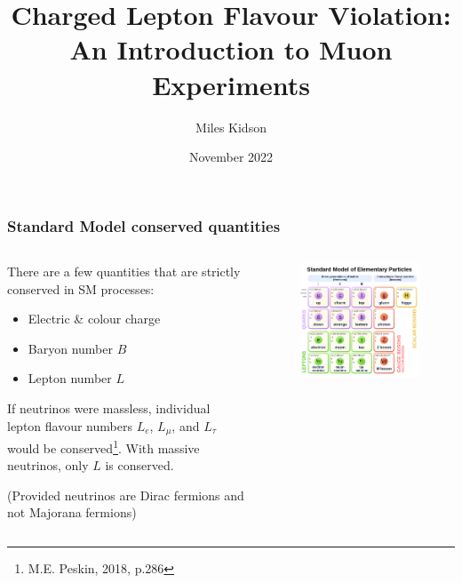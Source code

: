 \documentclass[11pt]{beamer}
\title[Charged Lepton Flavour Violation]{Charged Lepton Flavour Violation: \\ An Introduction to Muon Experiments} %
\author[Miles Kidson]{Miles Kidson} %
\institute[UCT]{University of Cape Town \\ \smallskip \textit{kdsmil001@myuct.ac.za}} %
\date[November 2022]{November 2022} %
\begin{document}
\frame[plain]{\titlepage}

\begin{frame}
    \frametitle{Standard Model conserved quantities}
    \begin{columns}[c]
        \begin{column}{0.6\textwidth}
            There are a few quantities that are strictly conserved in SM processes:
            \bigskip
            \begin{itemize}
                \item Electric \& colour charge
                \item Baryon number $B$
                \item Lepton number $L$
            \end{itemize}
            \bigskip
            If neutrinos were massless, individual lepton flavour numbers $L_e$, $L_\mu$, and $L_\tau$ would be conserved\footnote[frame]{M.E. Peskin, 2018, p.286}. With massive neutrinos, only $L$ is conserved.

            (Provided neutrinos are Dirac fermions and not Majorana fermions)

        \end{column}
        \begin{column}{0.4\textwidth}
            \begin{figure}[h]
                \begin{center}
                    \includegraphics[width=\textwidth]{SM.png}
                \end{center}
            \end{figure}
            
        \end{column}
        
    \end{columns}

    

\end{frame}
\end{document}
